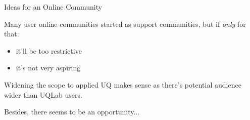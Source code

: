 \documentclass[]{rsuqbeamernew}
\begin{document}
\begin{frame}[t]{Ideas for an Online Community}

Many user online communities started as support communities, but if \emph{only} for that:
\begin{itemize}
  \item it'll be too restrictive %
  \item it's not very aspiring
\end{itemize}

\vspace{0.3cm}

Widening the scope to applied UQ makes sense as there's potential audience wider than UQLab users.

\vspace{0.3cm}

Besides, there seems to be an opportunity...

\end{frame}
\end{document}
